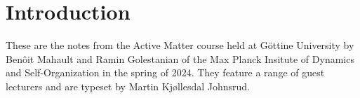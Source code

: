 \chapter{Introduction}

These are the notes from the Active Matter course held at Göttine University by Benôit Mahault and Ramin Golestanian of the Max Planck Insitute of Dynamics and Self-Organization in the spring of 2024.
They feature a range of guest lecturers and are typeset by Martin Kjøllesdal Johnsrud.